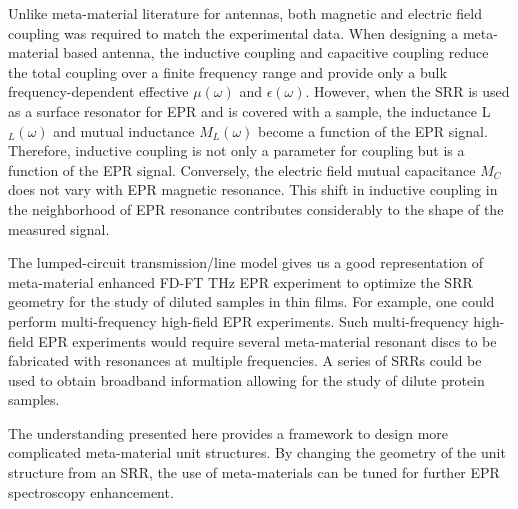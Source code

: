 Unlike meta-material literature for antennas, both magnetic and electric field coupling was required to match the experimental data. When designing a meta-material based antenna, the inductive coupling and capacitive coupling reduce the total coupling over a finite frequency range and provide only a bulk frequency-dependent effective $\mu(\omega)$ and $\epsilon(\omega)$. However, when the SRR is used as a surface resonator for EPR and is covered with a sample, the inductance L$_L(\omega)$ and mutual inductance $M_L(\omega)$ become a function of the EPR signal. Therefore, inductive coupling is not only a parameter for coupling but is a function of the EPR signal. Conversely, the electric field mutual capacitance $M_C$ does not vary with EPR magnetic resonance. This shift in inductive coupling in the neighborhood of EPR resonance contributes considerably to the shape of the measured signal.

The lumped-circuit transmission\-/line model gives us a good representation of meta-material enhanced FD-FT THz EPR experiment to optimize the SRR geometry for the study of diluted samples in thin films. For example, one could perform multi-frequency high-field EPR experiments. \cite{KRZYSTEK2006,Telser2014} Such multi-frequency high-field EPR experiments would require several meta-material resonant discs to be fabricated with resonances at multiple frequencies. A series of SRRs could be used to obtain broadband information allowing for the study of dilute protein samples.

The understanding presented here provides a framework to design more complicated meta-material unit structures. By changing the geometry of the unit structure from an SRR, the use of meta-materials can be tuned for further EPR spectroscopy enhancement. \cite{ZhangMetasurfaces}


{\renewcommand{\bibsection}{\clearpage\section*{\bibname}\markboth{\bibname}{\bibname}}
\renewcommand{\bibname}{CHAPTER 4. REFERENCES}


}